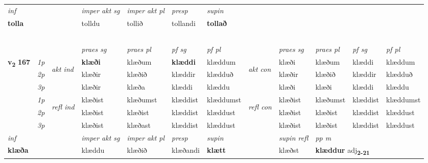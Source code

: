 \begin{longtable}[l]{X>{\footnotesize\itshape}llXXXXlXXXX}
   {\textit{inf}} & &  & \textit{imper akt sg} & \textit{imper akt pl}   & \textit{presp} & \textit{supin}   \\*
  {\textbf{tolla}} & && tolldu  & tollið   & tollandi &  \textbf{tollað}   \\*

\midrule
  & \\*
  & \\*
  & \\*
   & \\*
  & \\
   \midrule
 & &   & \textit{praes sg}  & \textit{praes pl}    & \textit{ pf sg} & \textit{pf pl} & & \textit{praes sg}  & \textit{praes pl}    & \textit{pf sg} & \textit{pf pl }  \\ \cmidrule{4-7} \cmidrule{9-12}
 \multirow{2}{*}{{{\textbf{v{\textsubscript{2}}} \Large{\textbf{167}}}}}  & 1p & \multirow{3}{*}{\begin{turn}{90}\textit{akt ind}\end{turn}} & \textbf{klæði} & klæðum & \textbf{klæddi} & klæddum & \multirow{3}{*}{\begin{turn}{90}\textit{akt con}\end{turn}} &klæði & klæðum & klæddi & klæddum\\*
 & 2p &  &  klæðir  & klæðið & klæddir & klædduð & & klæðir & klæðið & klæddir & klædduð \\*
 & 3p &  & klæðir & klæða & klæddi & klæddu & & klæði & klæði& klæddi & klæddu \\*
\cmidrule{4-7} \cmidrule{9-12}
 & 1p & \multirow{3}{*}{\begin{turn}{90}\textit{refl ind}\end{turn}}  & klæðist & klæðumst & klæddist & klæddumst & \multirow{3}{*}{\begin{turn}{90}\textit{refl con}\end{turn}}  &klæðist & klæðumst & klæddist & klæddumst \\*
 & 2p &  & klæðist & klæðist & klæddist & klæddust & &klæðist & klæðist & klæddist & klæddust \\*
 & 3p  & & klæðist & klæðast & klæddist & klæddust & & klæðist & klæðist& klæddist & klæddust \\*
\cmidrule{4-7} \cmidrule{9-12}

   {\textit{inf}} & &  & \textit{imper akt sg} & \textit{imper akt pl}   & \textit{presp} & \textit{supin} && \textit{supin refl} & \textit{pp m} \\*
  {\textbf{klæða}} & && klæddu  & klæðið   & klæðandi &  \textbf{klætt} && klæðst & \multicolumn{2}{l}{\textbf{klæddur} adj\textbf{\textsubscript{2-21}}} \\*


\end{longtable}

